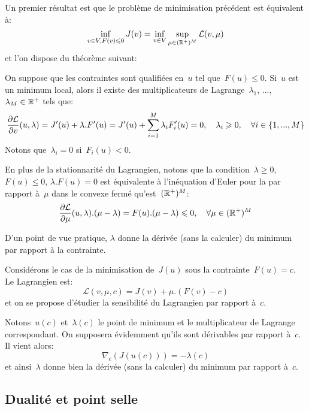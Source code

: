 \medskip
Un premier résultat est que le problème de minimisation précédent est équivalent à:
\begin{equation}
\inf_{v\in V, F(v)\leqslant0} J(v) = \inf_{v\in V} \sup_{\mu\in(\mathbb R^+)^M} \mathcal{L}(v,\mu)
\end{equation}
et l'on dispose du théorème suivant:
\begin{theoreme}
On suppose que les contraintes sont qualifiées en~$u$ tel que~$F(u)\le0$. Si~$u$ est un minimum local, alors il existe des multiplicateurs de Lagrange~$\lambda_1$, ..., $\lambda_M\in\mathbb R^+$ tels que:
\begin{equation}
\dfrac{\partial\mathcal{L}}{\partial v}(u,\lambda) = J'(u)+\lambda.F'(u)
= J'(u)+\displaystyle\sum_{i=1}^M\lambda_iF_i'(u) =0, \quad \lambda_i\geqslant0, 
\quad \forall i\in\{1, ..., M\}
\end{equation}
Notons que~$\lambda_i=0$ si~$F_i(u)<0$.

En plus de la stationnarité du Lagrangien, notons que la condition~$\lambda\ge0$, $F(u)\le 0$, $\lambda.F(u)=0$ est équivalente à l'inéquation d'Euler pour la  par rapport à~$\mu$ dans le convexe fermé qu'est~$(\mathbb R^+)^M$:
\begin{equation}
\dfrac{\partial\mathcal{L}}{\partial \mu}(u,\lambda).(\mu-\lambda)=F(u).(\mu-\lambda)\leqslant0, \quad \forall\mu\in(\mathbb R^+)^M
\end{equation}
\end{theoreme}

D'un point de vue pratique, $\lambda$ donne la dérivée (sans la calculer) du minimum par rapport à la contrainte.
\begin{demonstration}[Illustration]
Considérons le cas de la minimisation de~$J(u)$ sous la contrainte~$F(u)=c$.
Le Lagrangien est:
\[ \mathcal{L}(v,\mu,c)=J(v)+\mu.(F(v)-c) \]
et on se propose d'étudier la sensibilité du Lagrangien par rapport à~$c$.

Notons~$u(c)$ et~$\lambda(c)$ le point de minimum et le multiplicateur de Lagrange correspondant. On supposera évidemment qu'ils sont dérivables par rapport à~$c$. Il vient alors:
\[ \nabla_c\left(J(u(c))\right)=-\lambda(c) \]
et ainsi~$\lambda$ donne bien la dérivée (sans la calculer) du minimum par rapport à~$c$.
\end{demonstration}


\medskip
\subsection{Dualité et point selle}


